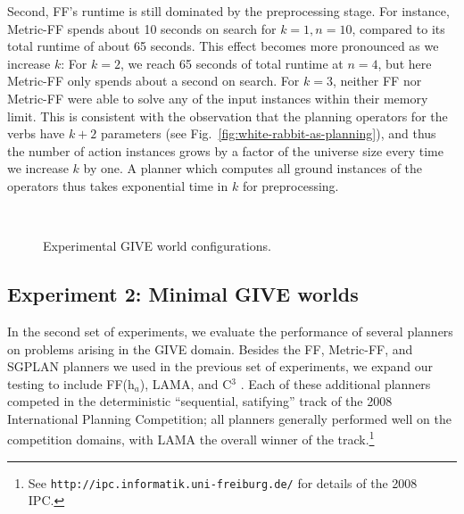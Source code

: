 Second, FF's runtime is still dominated by the preprocessing
stage. For instance, Metric-FF spends about 10 seconds on search for
$k=1,n=10$, compared to its total runtime of about 65 seconds. This
effect becomes more pronounced as we increase $k$: For $k=2$, we reach
65 seconds of total runtime at $n=4$, but here Metric-FF only spends
about a second on search. For $k=3$, neither FF nor Metric-FF were
able to solve any of the input instances within their memory
limit. This is consistent with the observation that the planning
operators for the verbs have $k+2$ parameters (see
Fig.~\ref{fig:white-rabbit-as-planning}), and thus the number of
action instances grows by a factor of the universe size every time we
increase $k$ by one. A planner which computes all ground instances of
the operators thus takes exponential time in $k$ for preprocessing.

\begin{figure}[t]
  \centering
  \qquad
   \\
  \caption{Experimental GIVE world configurations.}
  \label{fig:give-maps}
\end{figure}


\subsection{Experiment 2: Minimal GIVE worlds}
\label{sec:exper-2:-minim}

In the second set of experiments, we evaluate the performance of several
planners on problems arising in the GIVE domain. Besides the FF, Metric-FF, and
SGPLAN planners we used in the previous set of experiments, we expand our
testing to include FF(h$_a$), LAMA, and C$^3$ . Each of these
additional planners competed in the deterministic ``sequential, satifying''
track of the 2008 International Planning Competition; all planners generally
performed well on the competition domains, with LAMA the overall winner of
the track.\footnote{See \texttt{http://ipc.informatik.uni-freiburg.de/} for
details of the 2008 IPC.}

